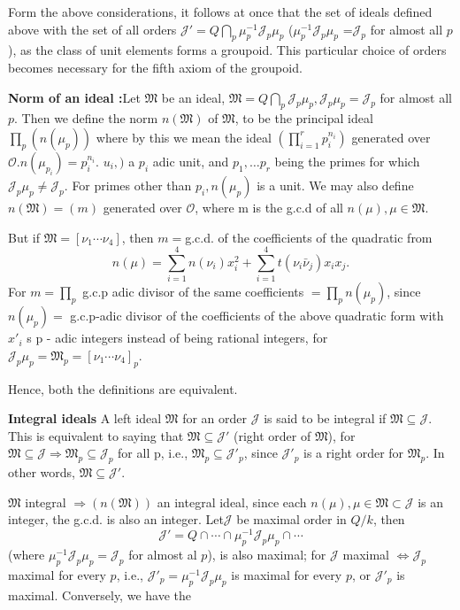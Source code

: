 Form the above considerations, it follows at once that the set of
ideals defined above with the set of all orders $\mathcal{J}' = Q
\bigcap \limits_{p}\mu^{-1}_p \mathcal{J}_p \mu_p$ ($\mu^{-1}_p
\mathcal{J}_p \mu_p$ =$\mathcal{J}_p $ for almost all $p$),  as the
class of unit elements forms a groupoid. This particular choice of
orders becomes necessary for the fifth axiom of the groupoid. 

\noindent
\textbf{Norm of an ideal :}\pageoriginale Let $\mathfrak{M}$ be an ideal,
$\mathfrak{M} =  Q \bigcap \limits_{p}\mathcal{J}_p \mu_p,
\mathcal{J}_p \mu_p = \mathcal{J}_p $ for almost all $p$. Then we
define the norm $n(\mathfrak{M})$ of $\mathfrak{M}$, to be the
principal ideal $\prod \limits_{p} (n (\mu_p))$ where by this we mean
the ideal $(\prod \limits^r_{i=1} p_i^{n_i})$ generated over
$\mathscr{O}. n(\mu_{p_i}) = p_i^{n_i}$. $u_i,)$ a $p_i$ adic unit, and
$p_1, \ldots p_r$ being the primes for which $\mathcal{J}_p \mu_p \neq
\mathcal{J}_p $. For primes other than $p_i,  n(\mu_p)$ is a unit. We
may also define $n(\mathfrak{M}) = (m)$ generated over $\mathscr{O}$,
where m is the g.c.d of all $n(\mu), \mu \in \mathfrak{M}$. 

But if $\mathfrak{M} = [\nu_1 \cdots \nu_4]$, then $m = $g.c.d. of the
coefficients of the quadratic from 
$$
n(\mu) = \sum^4_{i=1} n(\nu_i) x^2_i + \sum^4_{i=1} t(\nu_i \bar{\nu}_j) x_i x_j.
$$
For $m = \prod \limits_{p}$ g.c.p adic divisor of the same
coefficients $= \prod \limits_{p} n(\mu_p)$, since $n(\mu_p) =$
g.c.p-adic divisor of the coefficients of the above quadratic form
with $x'_i$ s p - adic integers instead of being rational integers,
for $\mathcal{J}_p \mu_p = \mathfrak{M}_p = [\nu_1 \cdots \nu_4]_p$. 

Hence, both the definitions are equivalent.

\noindent
\textbf{Integral ideals} A left ideal $\mathfrak{M}$ for an order
$\mathcal{J}$ is said to be integral if $\mathfrak{M}  \subseteq
\mathcal{J}$. This is equivalent to saying that $\mathfrak{M} \subseteq
\mathcal{J}'$ (right order of $\mathfrak{M}$), for $\mathfrak{M} \subseteq
\mathcal{J} \Rightarrow \mathfrak{M}_p \subseteq \mathcal{J}_p$ for all p,
i.e., $\mathfrak{M}_p \subseteq \mathcal{J}'_p$, since $\mathcal{J}'_p$ is a
right order for $\mathfrak{M}_p$. In other words, $\mathfrak{M} \subseteq
\mathcal{J}'$. 

$\mathfrak{M}$ integral $\Rightarrow (n(\mathfrak{M}))$ an integral
ideal, since each $n(\mu), \mu \in \mathfrak{M} \subset \mathcal{J}$
is an integer, the g.c.d. is also an integer. Let\pageoriginale $\mathcal{J}$ be
maximal order in $Q/k$, then  
$$
 \mathcal{J}' = Q \cap \cdots \cap \mu^{-1}_p  \mathcal{J}_p \mu_p \cap \cdots
$$
(where $\mu^{-1}_p  \mathcal{J}_p \mu_p = \mathcal{J}_p$ for almost al
 $p$), is also maximal; for $\mathcal{J}$ maximal $\Leftrightarrow
 \mathcal{J}_p$ maximal for every $p$, i.e., $\mathcal{J}'_p = \mu^{-1}_p
 \mathcal{J}_p \mu_p$ is maximal for every $p$, or $\mathcal{J}'_p$ is
 maximal. Conversely, we have the  

